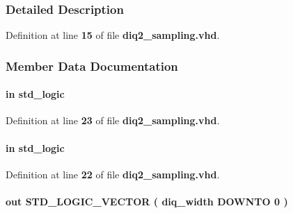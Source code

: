 \subsubsection{Detailed Description}


Definition at line {\bf 15} of file {\bf diq2\+\_\+sampling.\+vhd}.



\subsubsection{Member Data Documentation}
\paragraph[{clk\+\_\+int}]{ {\bfseries \textcolor{keywordflow}{in}\textcolor{vhdlchar}{ }} {\bfseries \textcolor{comment}{std\+\_\+logic}\textcolor{vhdlchar}{ }} \hspace{0.3cm}{\ttfamily [Port]}}\label{classdiq2__sampling_a9c3202efac4d1aca8bd76614acd233a1}


Definition at line {\bf 23} of file {\bf diq2\+\_\+sampling.\+vhd}.

\paragraph[{clk\+\_\+io}]{ {\bfseries \textcolor{keywordflow}{in}\textcolor{vhdlchar}{ }} {\bfseries \textcolor{comment}{std\+\_\+logic}\textcolor{vhdlchar}{ }} \hspace{0.3cm}{\ttfamily [Port]}}\label{classdiq2__sampling_a4b3b4f748a24640cf027481d31b94648}


Definition at line {\bf 22} of file {\bf diq2\+\_\+sampling.\+vhd}.

\paragraph[{data\+\_\+out\+\_\+h}]{ {\bfseries \textcolor{keywordflow}{out}\textcolor{vhdlchar}{ }} {\bfseries \textcolor{comment}{S\+T\+D\+\_\+\+L\+O\+G\+I\+C\+\_\+\+V\+E\+C\+T\+OR}\textcolor{vhdlchar}{ }\textcolor{vhdlchar}{(}\textcolor{vhdlchar}{ }\textcolor{vhdlchar}{ }\textcolor{vhdlchar}{ }\textcolor{vhdlchar}{ }{\bfseries {\bf diq\+\_\+width}} \textcolor{vhdlchar}{ }\textcolor{keywordflow}{D\+O\+W\+N\+TO}\textcolor{vhdlchar}{ }\textcolor{vhdlchar}{ } \textcolor{vhdldigit}{0} \textcolor{vhdlchar}{ }\textcolor{vhdlchar}{)}\textcolor{vhdlchar}{ }} \hspace{0.3cm}{\ttfamily [Port]}}\label{classdiq2__sampling_add3ca70c64d0b79b25c1df9ca4654185}


